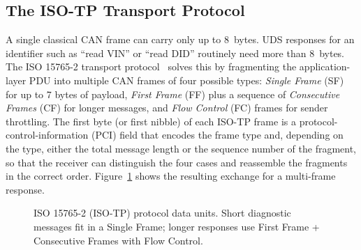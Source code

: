 \documentclass[11pt,a4paper,oneside,parskip=half]{scrreprt}
\begin{document}
\subsection{The ISO-TP Transport Protocol}
A single classical CAN frame can carry only up to 8~bytes. UDS responses for an identifier such as ``read VIN'' or ``read DID'' routinely need more than 8~bytes. The ISO 15765-2 transport protocol~\cite{iso15765} solves this by fragmenting the application-layer PDU into multiple CAN frames of four possible types: \textit{Single Frame} (SF) for up to 7 bytes of payload, \textit{First Frame} (FF) plus a sequence of \textit{Consecutive Frames} (CF) for longer messages, and \textit{Flow Control} (FC) frames for sender throttling. The first byte (or first nibble) of each ISO-TP frame is a protocol-control-information (PCI) field that encodes the frame type and, depending on the type, either the total message length or the sequence number of the fragment, so that the receiver can distinguish the four cases and reassemble the fragments in the correct order. Figure~\ref{fig:isotp} shows the resulting exchange for a multi-frame response.

\begin{figure}[H]
\centering
{}
\caption{ISO 15765-2 (ISO-TP) protocol data units. Short diagnostic messages fit in a Single Frame; longer responses use First Frame + Consecutive Frames with Flow Control.}
\label{fig:isotp}
\end{figure}
\end{document}
